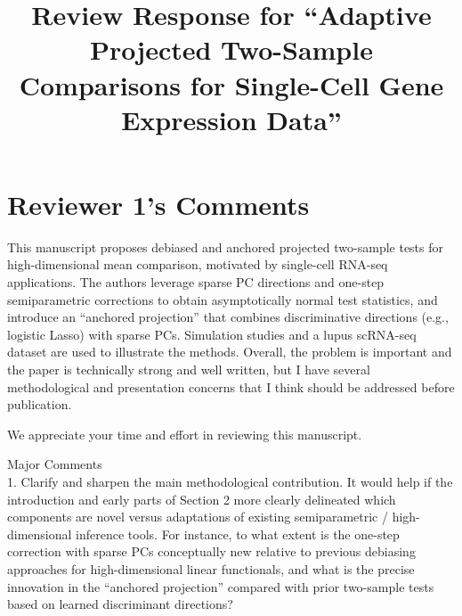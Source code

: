 \documentclass{article}
\title{Review Response for ``Adaptive Projected Two-Sample Comparisons for Single-Cell Gene Expression Data''}
\date{\vspace{-5ex}}
\date{}  %
\theoremstyle{definition}
\begin{document}
\maketitle
\vspace{-30mm}




\newpage
\section{Reviewer 1's Comments}

\begin{shaded}
This manuscript proposes debiased and anchored projected two-sample tests for high-dimensional mean comparison, motivated by single-cell RNA-seq applications. The authors leverage sparse PC directions and one-step semiparametric corrections to obtain asymptotically normal test statistics, and introduce an “anchored projection” that combines discriminative directions (e.g., logistic Lasso) with sparse PCs. Simulation studies and a lupus scRNA-seq dataset are used to illustrate the methods. Overall, the problem is important and the paper is technically strong and well written, but I have several methodological and presentation concerns that I think should be addressed before publication.
\end{shaded}

We appreciate your time and effort in reviewing this manuscript.

\begin{shaded}
Major Comments\\
1. Clarify and sharpen the main methodological contribution.
It would help if the introduction and early parts of Section 2 more clearly delineated which components are novel versus adaptations of existing semiparametric / high-dimensional inference tools. For instance, to what extent is the one-step correction with sparse PCs conceptually new relative to previous debiasing approaches for high-dimensional linear functionals, and what is the precise innovation in the “anchored projection” compared with prior two-sample tests based on learned discriminant directions?
\end{shaded}
\end{document}
